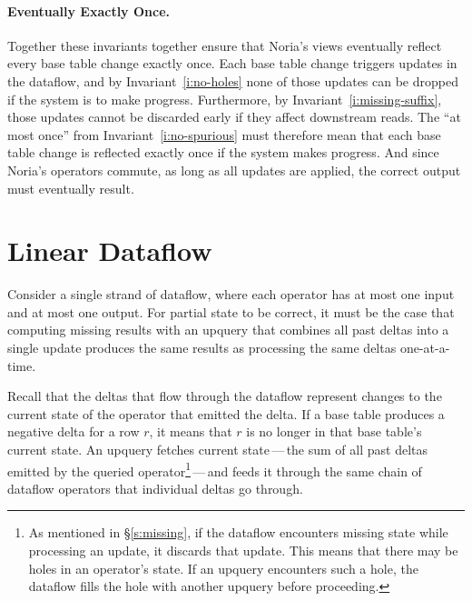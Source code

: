 \paragraph{Eventually Exactly Once.}
Together these invariants together ensure that Noria's views eventually reflect
every base table change exactly once. Each base table change triggers updates in
the dataflow, and by Invariant~\ref{i:no-holes} none of those updates can be
dropped if the system is to make progress. Furthermore, by
Invariant~\ref{i:missing-suffix}, those updates cannot be discarded early if
they affect downstream reads. The ``at most once'' from
Invariant~\ref{i:no-spurious} must therefore mean that each base table change is
reflected exactly once if the system makes progress. And since Noria's operators
commute, as long as all updates are applied, the correct output must eventually
result.


\section{Linear Dataflow}
\label{s:partial:linear}

Consider a single strand of dataflow, where each operator has at most one input
and at most one output. For partial state to be correct, it must be the case
that computing missing results with an upquery that combines all past deltas
into a single update produces the same results as processing the same deltas
one-at-a-time.

Recall that the deltas that flow through the dataflow represent changes to the
current state of the operator that emitted the delta. If a base table produces
a negative delta for a row $r$, it means that $r$ is no longer in that base
table's current state. An upquery fetches current state\,---\,the sum of all
past deltas emitted by the queried operator\footnote{As mentioned in
\S\ref{s:missing}, if the dataflow encounters missing state while processing an
update, it discards that update. This means that there may be holes in an
operator's state. If an upquery encounters such a hole, the dataflow fills the
hole with another upquery before proceeding.}\,---\,and feeds it through the
same chain of dataflow operators that individual deltas go through.

